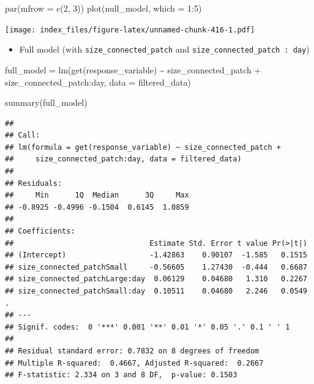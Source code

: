 \documentclass[
]{article}
\newenvironment{Shaded}{\begin{snugshade}}{\end{snugshade}}
\newcommand{\AttributeTok}[1]{\textcolor[rgb]{0.77,0.63,0.00}{#1}}
\newcommand{\DecValTok}[1]{\textcolor[rgb]{0.00,0.00,0.81}{#1}}
\newcommand{\FunctionTok}[1]{\textcolor[rgb]{0.00,0.00,0.00}{#1}}
\newcommand{\NormalTok}[1]{#1}
\newcommand{\OtherTok}[1]{\textcolor[rgb]{0.56,0.35,0.01}{#1}}
\newcommand{\SpecialCharTok}[1]{\textcolor[rgb]{0.00,0.00,0.00}{#1}}
\providecommand{\tightlist}{%
  \setlength{\itemsep}{0pt}\setlength{\parskip}{0pt}}
\begin{document}
\begin{Shaded}
\begin{Highlighting}[]
\FunctionTok{par}\NormalTok{(}\AttributeTok{mfrow =} \FunctionTok{c}\NormalTok{(}\DecValTok{2}\NormalTok{, }\DecValTok{3}\NormalTok{))}
\FunctionTok{plot}\NormalTok{(null\_model, }\AttributeTok{which =} \DecValTok{1}\SpecialCharTok{:}\DecValTok{5}\NormalTok{)}
\end{Highlighting}
\end{Shaded}

\texttt{[image: index\_files/figure-latex/unnamed-chunk-416-1.pdf]}

\begin{itemize}
\tightlist
\item
  Full model (with \texttt{size\_connected\_patch} and
  \texttt{size\_connected\_patch\ :\ day})
\end{itemize}

\begin{Shaded}
\begin{Highlighting}[]
\NormalTok{full\_model }\OtherTok{=} \FunctionTok{lm}\NormalTok{(}\FunctionTok{get}\NormalTok{(response\_variable) }\SpecialCharTok{\textasciitilde{}}
\NormalTok{                  size\_connected\_patch }\SpecialCharTok{+}
\NormalTok{                  size\_connected\_patch}\SpecialCharTok{:}\NormalTok{day,}
                \AttributeTok{data =}\NormalTok{ filtered\_data)}

\FunctionTok{summary}\NormalTok{(full\_model)}
\end{Highlighting}
\end{Shaded}

\begin{verbatim}
## 
## Call:
## lm(formula = get(response_variable) ~ size_connected_patch + 
##     size_connected_patch:day, data = filtered_data)
## 
## Residuals:
##     Min      1Q  Median      3Q     Max 
## -0.8925 -0.4996 -0.1504  0.6145  1.0859 
## 
## Coefficients:
##                               Estimate Std. Error t value Pr(>|t|)  
## (Intercept)                   -1.42863    0.90107  -1.585   0.1515  
## size_connected_patchSmall     -0.56605    1.27430  -0.444   0.6687  
## size_connected_patchLarge:day  0.06129    0.04680   1.310   0.2267  
## size_connected_patchSmall:day  0.10511    0.04680   2.246   0.0549 .
## ---
## Signif. codes:  0 '***' 0.001 '**' 0.01 '*' 0.05 '.' 0.1 ' ' 1
## 
## Residual standard error: 0.7832 on 8 degrees of freedom
## Multiple R-squared:  0.4667, Adjusted R-squared:  0.2667 
## F-statistic: 2.334 on 3 and 8 DF,  p-value: 0.1503
\end{verbatim}
\end{document}
